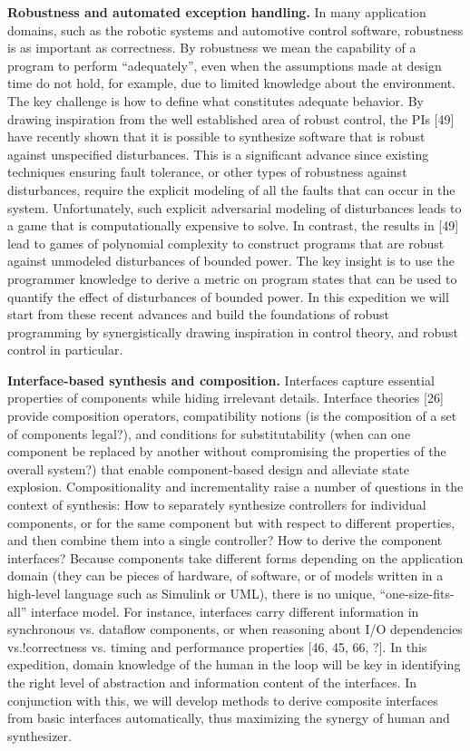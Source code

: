 \textbf{Robustness and automated exception handling.} In many application domains, such as the robotic systems and automotive control software, robustness is as important as correctness. By robustness we mean the capability of a program to perform “adequately”, even when the assumptions made at design time do not hold, for example, due to limited knowledge about the environment. The key challenge is how to define what constitutes adequate behavior. By drawing inspiration from the well established area of robust control, the PIs [49] have recently shown that it is possible to synthesize software that is robust against unspecified disturbances. This is a significant advance since existing techniques ensuring fault tolerance, or other types of robustness against disturbances, require the explicit modeling of all the faults that can occur in the system. Unfortunately, such explicit adversarial modeling of disturbances leads to a game that is computationally expensive to solve. In contrast, the results in [49] lead to games of polynomial complexity to construct programs that are robust against unmodeled disturbances of bounded power. The key insight is to use the programmer knowledge to derive a metric on program states that can be used to quantify the effect of disturbances of bounded power. In this expedition we will start from these recent advances and build the foundations of robust programming by synergistically drawing inspiration in control theory, and robust control in particular.


\textbf{Interface-based synthesis and composition.} Interfaces capture essential properties of components while hiding irrelevant details. Interface theories [26] provide composition operators, compatibility notions (is the composition of a set of components legal?), and conditions for substitutability (when can one component be replaced by another without compromising the properties of the overall system?) that enable component-based design and alleviate state explosion. Compositionality and incrementality raise a number of questions in the context of synthesis: How to separately synthesize controllers for individual components, or for the same component but with respect to different properties, and then combine them into a single controller? How to derive the component interfaces? Because components take different forms depending on the application domain (they can be pieces of hardware, of software, or of models written in a high-level language such as Simulink or UML), there is no unique, “one-size-fits-all” interface model. For instance, interfaces carry different information in synchronous vs. dataflow components, or when reasoning about I/O dependencies vs.!correctness vs. timing and performance properties [46, 45, 66, ?]. In this expedition, domain knowledge of the human in the loop will be key in identifying the right level of abstraction and information content of the interfaces. In conjunction with this, we will develop methods to derive composite interfaces from basic interfaces automatically, thus maximizing the synergy of human and synthesizer.

